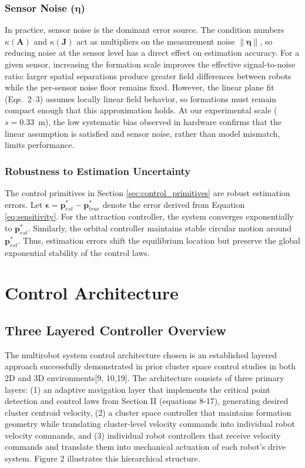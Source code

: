 \documentclass[lettersize,journal]{IEEEtran}
\begin{document}
\subsubsection{Sensor Noise ($\boldsymbol{\eta}$)}
In practice, sensor noise is the dominant error source. The condition numbers $\kappa(\mathbf{A})$ and $\kappa(\mathbf{J})$ act as multipliers on the measurement noise $\|\boldsymbol{\eta}\|$, so reducing noise at the sensor level has a direct effect on estimation accuracy. For a given sensor, increasing the formation scale improves the effective signal-to-noise ratio: larger spatial separations produce greater field differences between robots while the per-sensor noise floor remains fixed. However, the linear plane fit (Eqs.~2--3) assumes locally linear field behavior, so formations must remain compact enough that this approximation holds. At our experimental scale ($s = 0.33$~m), the low systematic bias observed in hardware confirms that the linear assumption is satisfied and sensor noise, rather than model mismatch, limits performance.


\subsubsection{Robustness to Estimation Uncertainty}
The control primitives in Section \ref{sec:control_primitives} are robust estimation errors. Let $\boldsymbol{\epsilon} = \mathbf{p}^*_{est} - \mathbf{p}^*_{true}$ denote the error derived from Equation \ref{eq:sensitivity}. For the attraction controller, the system converges exponentially to $\mathbf{p}^*_{est}$. Similarly, the orbital controller maintains stable circular motion around $\mathbf{p}^*_{est}$. Thus, estimation errors shift the equilibrium location but preserve the global exponential stability of the control laws.




\section{Control Architecture}

\subsection{Three Layered Controller Overview}

The multirobot system control architecture chosen is an established layered approach successfully demonstrated in prior cluster space control studies in both 2D and 3D environments[9, 10,19]. The architecture consists of three primary layers: (1) an adaptive navigation layer that implements the critical point detection and control laws from Section II (equations 8-17), generating desired cluster centroid velocity, (2) a cluster space controller that maintains formation geometry while translating cluster-level velocity commands into individual robot velocity commands, and (3) individual robot controllers that receive velocity commands and translate them into mechanical actuation of each robot's drive system. Figure 2 illustrates this hierarchical structure.
\end{document}
